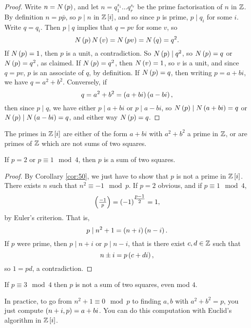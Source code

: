 \begin{proof}
Write $ n = N\br{p} $, and let $ n = q_1^{s_1} \dots q_r^{s_r} $ be the prime factorisation of $ n $ in $ \mathbb{Z} $. By definition $ n = p\bar{p} $, so $ p \mid n $ in $ \Z\sbr{i} $, and so since $ p $ is prime, $ p \mid q_i $ for some $ i $. Write $ q = q_i $. Then $ p \mid q $ implies that $ q = pv $ for some $ v $, so
$$ N\br{p}N\br{v} = N\br{pv} = N\br{q} = q^2. $$
If $ N\br{p} = 1 $, then $ p $ is a unit, a contradiction. So $ N\br{p} \mid q^2 $, so $ N\br{p} = q $ or $ N\br{p} = q^2 $, as claimed. If $ N\br{p} = q^2 $, then $ N\br{v} = 1 $, so $ v $ is a unit, and since $ q = pv $, $ p $ is an associate of $ q $, by definition. If $ N\br{p} = q $, then writing $ p = a + bi $, we have $ q = a^2 + b^2 $. Conversely, if
$$ q = a^2 + b^2 = \br{a + bi}\br{a - bi}, $$
then since $ p \mid q $, we have either $ p \mid a + bi $ or $ p \mid a - bi $, so $ N\br{p} \mid N\br{a + bi} = q $ or $ N\br{p} \mid N\br{a - bi} = q $, and either way $ N\br{p} = q $.
\end{proof}

\begin{corollary}
\label{cor:50}
The primes in $ \Z\sbr{i} $ are either of the form $ a + bi $ with $ a^2 + b^2 $ a prime in $ \mathbb{Z} $, or are primes of $ \mathbb{Z} $ which are not sums of two squares.
\end{corollary}

\pagebreak

\begin{theorem}
If $ p = 2 $ or $ p \equiv 1 \mod 4 $, then $ p $ is a sum of two squares.
\end{theorem}

\begin{proof}
By Corollary \ref{cor:50}, we just have to show that $ p $ is not a prime in $ \Z\sbr{i} $. There exists $ n $ such that $ n^2 \equiv -1 \mod p $. If $ p = 2 $ obvious, and if $ p \equiv 1 \mod 4 $,
$$ \jacobi{-1}{p} = \br{-1}^{\tfrac{p - 1}{2}} = 1, $$
by Euler's criterion. That is,
$$ p \mid n^2 + 1 = \br{n + i}\br{n - i}. $$
If $ p $ were prime, then $ p \mid n + i $ or $ p \mid n - i $, that is there exist $ c, d \in \mathbb{Z} $ such that
$$ n \pm i = p\br{c + di}, $$
so $ 1 = pd $, a contradiction.
\end{proof}

\begin{remark*}
If $ p \equiv 3 \mod 4 $ then $ p $ is not a sum of two squares, even mod $ 4 $.
\end{remark*}

\begin{remark*}
In practice, to go from $ n^2 + 1 \equiv 0 \mod p $ to finding $ a, b $ with $ a^2 + b^2 = p $, you just compute $ \br{n + i, p} = a + bi $. You can do this computation with Euclid's algorithm in $ \Z\sbr{i} $.
\end{remark*}

